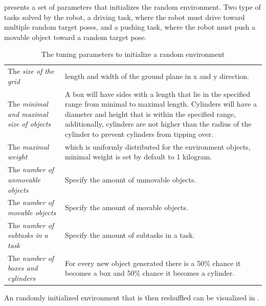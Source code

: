  presents a set of parameters that initializes the random environment. Two type of tasks solved by the robot, a driving task, where the robot must drive toward multiple random target poses, and a pushing task, where the robot must push a movable object toward a random target pose.\bs

\noindent
\begin{table}[H]
\caption{The tuning parameters to initialize a random environment}%
\label{table:configure_rand_env}
\centering
\begin{tabular}%
{>{\raggedright\arraybackslash}p{}%
>{\raggedright\arraybackslash}p{}}
The \textit{size of the grid} & length and width of the ground plane in \gls{x} and \gls{y} direction.\\
The \textit{minimal and maximal size of objects} & A box will have sides with a length that lie in the specified range from minimal to maximal length. Cylinders will have a diameter and height that is within the specified range, additionally, cylinders are not higher than the radius of the cylinder to prevent cylinders from tipping over. \\
The \textit{maximal weight} & which is uniformly distributed for the environment objects, minimal weight is set by default to 1 kilogram. \\
The \textit{number of unmovable objects} & Specify the amount of unmovable objects.\\
The \textit{number of movable objects} & Specify the amount of movable objects.\\
The \textit{number of subtasks in a task} & Specify the amount of subtasks in a task.\\
The \textit{number of boxes and cylinders} & For every new object generated there is a 50\% chance it becomes a box and 50\% chance it becomes a cylinder.
\end{tabular}
\end{table}

An randomly initialized environment that is then reshuffled can be visualized in .\bs

